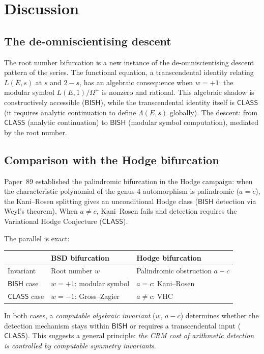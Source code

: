 \documentclass[11pt]{article}
\theoremstyle{plain}
\theoremstyle{definition}
\theoremstyle{remark}
\newcommand{\BISH}{\ensuremath{\mathsf{BISH}}}
\newcommand{\CLASS}{\ensuremath{\mathsf{CLASS}}}
\begin{document}
\section{Discussion}
\label{sec:discussion}

\subsection{The de-omniscientising descent}

The root number bifurcation is a new instance of the de-omniscientising descent pattern of the series. The functional equation, a transcendental identity relating $L(E,s)$ at $s$ and $2-s$, has an algebraic consequence when $w = +1$: the modular symbol $L(E,1)/\Omega^+$ is nonzero and rational. This algebraic shadow is constructively accessible ($\BISH$), while the transcendental identity itself is $\CLASS$ (it requires analytic continuation to define $\Lambda(E,s)$ globally). The descent: from $\CLASS$ (analytic continuation) to $\BISH$ (modular symbol computation), mediated by the root number.

\subsection{Comparison with the Hodge bifurcation}

Paper~89 \cite{paper89} established the palindromic bifurcation in the Hodge campaign: when the characteristic polynomial of the genus-4 automorphism is palindromic ($a = c$), the Kani--Rosen splitting gives an unconditional Hodge class ($\BISH$ detection via Weyl's theorem). When $a \neq c$, Kani--Rosen fails and detection requires the Variational Hodge Conjecture ($\CLASS$).

The parallel is exact:
\begin{center}
\begin{tabular}{lll}
\toprule
& \textbf{BSD bifurcation} & \textbf{Hodge bifurcation} \\
\midrule
Invariant & Root number $w$ & Palindromic obstruction $a - c$ \\
$\BISH$ case & $w = +1$: modular symbol & $a = c$: Kani--Rosen \\
$\CLASS$ case & $w = -1$: Gross--Zagier & $a \neq c$: VHC \\
\bottomrule
\end{tabular}
\end{center}

In both cases, a \emph{computable algebraic invariant} ($w$, $a - c$) determines whether the detection mechanism stays within $\BISH$ or requires a transcendental input ($\CLASS$). This suggests a general principle: \emph{the CRM cost of arithmetic detection is controlled by computable symmetry invariants}.
\end{document}
